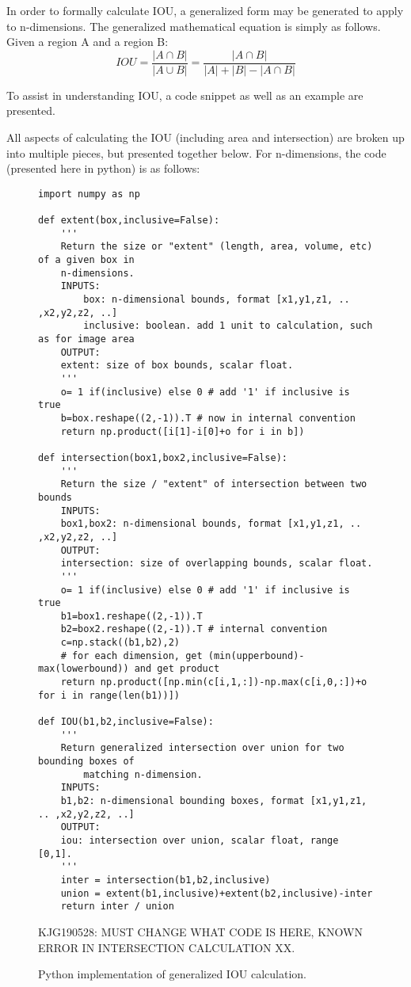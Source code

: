In order to formally calculate IOU, a generalized form may be generated to apply to n-dimensions. The generalized mathematical equation is simply as follows. Given a region A and a region B: 
\begin{equation}
IOU = \frac{|A\cap B|}{|A\cup B|} = \frac{|A\cap B|}{|A|+|B|- |A\cap B|}
\end{equation}

To assist in understanding IOU, a code snippet as well as an example are presented.

All aspects of calculating the IOU (including area and intersection) are broken up into multiple pieces, but presented together below. For n-dimensions, the code (presented here in python) is as follows: 


\begin{figure}[ht]
\begin{lstlisting}
import numpy as np

def extent(box,inclusive=False):
    '''
    Return the size or "extent" (length, area, volume, etc) of a given box in
    n-dimensions.
    INPUTS:
        box: n-dimensional bounds, format [x1,y1,z1, .. ,x2,y2,z2, ..]
        inclusive: boolean. add 1 unit to calculation, such as for image area
    OUTPUT:
    extent: size of box bounds, scalar float.
    '''
    o= 1 if(inclusive) else 0 # add '1' if inclusive is true
    b=box.reshape((2,-1)).T # now in internal convention
    return np.product([i[1]-i[0]+o for i in b])

def intersection(box1,box2,inclusive=False):
    '''
    Return the size / "extent" of intersection between two bounds
    INPUTS:
    box1,box2: n-dimensional bounds, format [x1,y1,z1, .. ,x2,y2,z2, ..]
    OUTPUT:
    intersection: size of overlapping bounds, scalar float.
    '''
    o= 1 if(inclusive) else 0 # add '1' if inclusive is true
    b1=box1.reshape((2,-1)).T
    b2=box2.reshape((2,-1)).T # internal convention
    c=np.stack((b1,b2),2)
    # for each dimension, get (min(upperbound)-max(lowerbound)) and get product
    return np.product([np.min(c[i,1,:])-np.max(c[i,0,:])+o for i in range(len(b1))])

def IOU(b1,b2,inclusive=False):
    '''
    Return generalized intersection over union for two bounding boxes of 
        matching n-dimension.
    INPUTS:
    b1,b2: n-dimensional bounding boxes, format [x1,y1,z1, .. ,x2,y2,z2, ..]
    OUTPUT:
    iou: intersection over union, scalar float, range [0,1].
    '''
    inter = intersection(b1,b2,inclusive)
    union = extent(b1,inclusive)+extent(b2,inclusive)-inter
    return inter / union

\end{lstlisting}
\onehalfspacing %
\caption{Python implementation of generalized IOU calculation.}
KJG190528: MUST CHANGE WHAT CODE IS HERE, KNOWN ERROR IN INTERSECTION CALCULATION XX.
\label{codeBlock1}
\end{figure}


